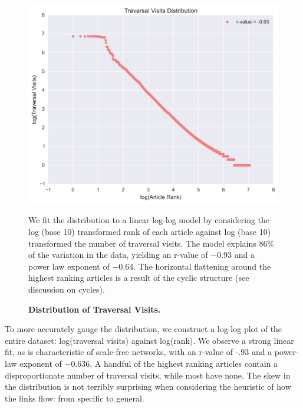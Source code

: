 \documentclass[pre,twocolumn,twoside,superscriptaddress,floatfix, aps, 10pt]{revtex4-1}
\begin{document}
\begin{figure}[tp!]
  \centering	
  \includegraphics[width=\columnwidth]{graphics/traversals_per_article.png} 
  \caption{
    \textbf{Distribution of Traversal Visits.}
  }
  We fit the distribution to a linear log-log model by considering the log (base 10) transformed rank of each article against log (base 10) transformed the number of traversal visits. 
  The model explains $86\%$ of the variation in the data, yielding an r-value of $-0.93$ 
  and a power law exponent of $-0.64$. The horizontal flattening around the highest
  ranking articles is a result of the cyclic structure (see discussion on cycles).
  \label{fig:Distribution of Visits}

\end{figure}

To more accurately gauge the distribution, we construct a log-log plot of the entire dataset: log(traversal visits) against log(rank). 
We observe a strong linear fit, as is characteristic of scale-free networks, with an r-value of -.93 and 
a power-law exponent of $-0.636$. A handful of the highest ranking articles contain a disproportionate number of traversal visits, while most have none. The skew in the distribution is not terribly surprising when considering the heuristic of how the links flow: from specific to general. 
\end{document}
